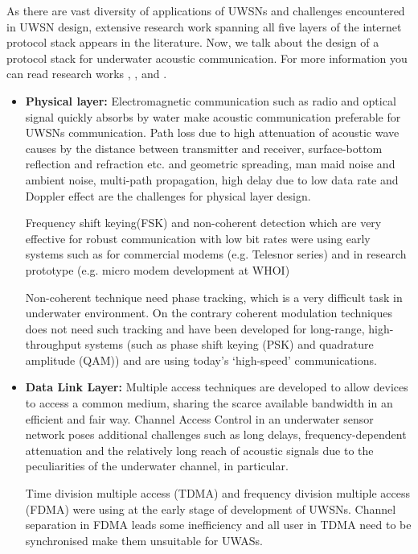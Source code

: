 \documentclass[12pt]{article}
\begin{document}
 As there are vast diversity of applications of UWSNs and challenges encountered in UWSN design, extensive research work spanning all five layers of the internet protocol stack appears in the literature. Now, we talk about the design of a protocol stack for underwater acoustic
communication. For more information you can read research works \cite{cui2006challenges}, \cite{heidemann2012underwater}, \cite{akyildiz2005underwater} and \cite{benson2006design}.
\begin{itemize}
\item  \textbf{Physical layer: }
Electromagnetic communication such as radio and optical signal quickly absorbs by  water make acoustic communication preferable for UWSNs communication. Path loss due to  high attenuation of acoustic wave causes by the distance between transmitter and receiver, surface-bottom reflection and refraction etc. and geometric spreading, man maid noise and ambient noise, multi-path propagation, high delay due to low data rate and Doppler effect are the challenges for physical layer design.

Frequency shift keying(FSK) and non-coherent detection which are very effective for robust communication with low bit rates were using early systems such as for commercial modems (e.g. Telesnor series\cite{green2010acoustic}) and in research prototype (e.g. micro modem development at WHOI\cite{singh2009acoustic})

Non-coherent technique need phase tracking,
which is a very difficult task in underwater environment.
On the contrary coherent modulation techniques does not need such tracking and have been developed for long-range, high-throughput systems \cite{stojanovic1993adaptive} (such as phase shift keying (PSK) and quadrature amplitude (QAM)) and are using today's ‘high-speed’ communications.
\item \textbf{Data Link Layer: }
Multiple access techniques are developed to allow devices to access a common
medium, sharing the scarce available bandwidth in an efficient and fair way.
Channel Access Control in an underwater sensor network poses additional
challenges such as long delays, frequency-dependent attenuation and the relatively
long reach of acoustic signals due to the peculiarities of the underwater channel, in particular.

Time division multiple access (TDMA) and frequency division multiple access (FDMA) were using at the early stage of development of UWSNs. Channel separation in FDMA leads some inefficiency and all user in TDMA need to be synchronised make them unsuitable for UWASs.



\end{itemize}
\end{document}
